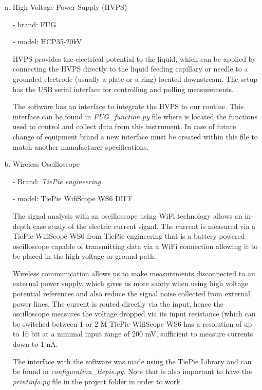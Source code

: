 \begin{enumerate}[a)]

  \item High Voltage Power Supply (HVPS)
  
     - brand: FUG
    
     - model: HCP35-20kV
    
    HVPS provides the electrical potential to the liquid, which can be applied by connecting the HVPS directly to the liquid feeding capillary or needle to a grounded electrode (usually a plate or a ring) located downstream.\cite{Monica}
    The setup has the USB serial interface for controlling and polling measurements.
    
    The software has an interface to integrate the HVPS to our routine. This interface can be found in \emph{FUG\_function.py} file where is located the functions used to control and collect data from this instrument.
    In case of future change of equipment brand a new interface must be created within this file to match another manufacturer specifications.

  \item Wireless Oscilloscope
  
     - Brand: \emph{TiePie engineering}

     - model: TiePie WifiScope WS6 DIFF
    
    The signal analysis with an oscilloscope using WiFi technology allows an in-depth case study of the electric current signal.
    The current is measured via a TiePie WifiScope WS6 from TiePie engineering that is a battery powered oscilloscope capable of transmitting data via a WiFi connection allowing it to be placed in the high voltage or ground path.
    
    Wireless communication allows us to make measurements disconnected to an external power supply, which gives us more safety when using high voltage potential references and also reduce the signal noise collected from external power lines.
    The current is routed directly via the input, hence the oscilloscope measures the voltage dropped via its input resistance (which can be switched between 1 or 2 M%
    TiePie WifiScope WS6 has a resolution of up to 16 bit at a minimal input range of 200 mV, sufficient to measure currents down to 1 nA.

    The interface with the software was made using the TiePie Library\cite{TiePieLib} and can be found in \emph{configuration\_tiepie.py}. Note that is also important to have the \emph{printinfo.py} file in the project folder in order to work.


\end{enumerate}

